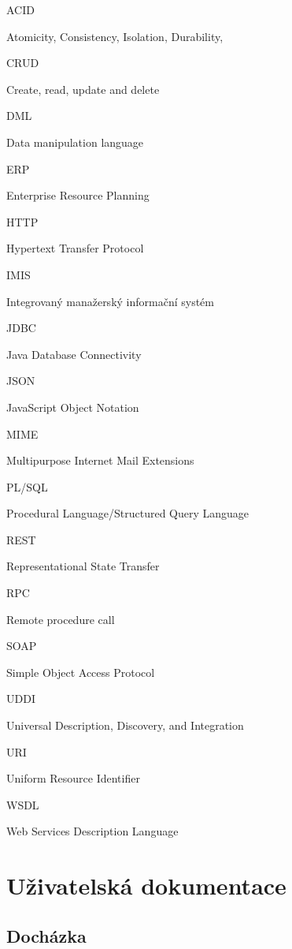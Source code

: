 \documentclass{diplomka}
\begin{document}
\begin{list}{}{\setlength{\leftmargin}{30mm}
\setlength{\labelwidth}{30mm} \setlength{\labelsep}{0mm} }
\item[\parbox{30mm}{ACID}] Atomicity, Consistency, Isolation, Durability,
\item[\parbox{30mm}{CRUD}] Create, read, update and delete
\item[\parbox{30mm}{DML}] Data manipulation language
\item[\parbox{30mm}{ERP}] Enterprise Resource Planning 
\item[\parbox{30mm}{HTTP}] Hypertext Transfer Protocol
\item[\parbox{30mm}{IMIS}] Integrovaný manažerský informační systém
\item[\parbox{30mm}{JDBC}] Java Database Connectivity
\item[\parbox{30mm}{JSON}] JavaScript Object Notation
\item[\parbox{30mm}{MIME}] Multipurpose Internet Mail Extensions
\item[\parbox{30mm}{PL/SQL}] Procedural Language/Structured Query Language
\item[\parbox{30mm}{REST}] Representational State Transfer
\item[\parbox{30mm}{RPC}] Remote procedure call
\item[\parbox{30mm}{SOAP}] Simple Object Access Protocol
\item[\parbox{30mm}{UDDI}] Universal Description, Discovery, and Integration
\item[\parbox{30mm}{URI}] Uniform Resource Identifier
\item[\parbox{30mm}{WSDL}] Web Services Description Language
\end{list}

\appendix



\pagestyle{fancy}

\chapter{Uživatelská dokumentace}
\section{Docházka}
\end{document}
